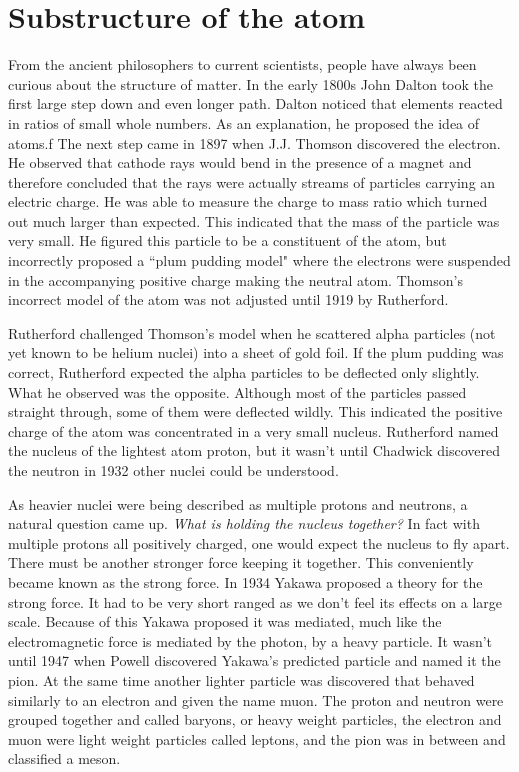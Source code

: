\documentclass[abstract = on,listof=totoc, bibliography=totoc]{scrreprt}
\begin{document}
\section{Substructure of the atom}

From the ancient philosophers to current scientists, people have always been curious about the structure of matter. In the early 1800s John Dalton took the first large step down and even longer path. Dalton noticed that elements reacted in ratios of small whole numbers. As an explanation, he proposed the idea of atoms.f The next step came in 1897 when J.J. Thomson discovered the electron. He observed that cathode rays would bend in the presence of a magnet and therefore concluded that the rays were actually streams of particles carrying an electric charge. He was able to measure the charge to mass ratio which turned out much larger than expected. This indicated that the mass of the particle was very small. He figured this particle to be a constituent of the atom, but incorrectly proposed a ``plum pudding model" where the electrons were suspended in the accompanying positive charge making the neutral atom. Thomson's incorrect model of the atom was not adjusted until 1919 by Rutherford.

Rutherford challenged Thomson's model when he scattered alpha particles (not yet known to be helium nuclei) into a sheet of gold foil. If the plum pudding was correct, Rutherford expected the alpha particles to be deflected only slightly. What he observed was the opposite. Although most of the particles passed straight through, some of them were deflected wildly. This indicated the positive charge of the atom was concentrated in a very small nucleus. Rutherford named the nucleus of the lightest atom proton, but it wasn't until Chadwick discovered the neutron in 1932 other nuclei could be understood.\cite{IEP}

As heavier nuclei were being described as multiple protons and neutrons, a natural question came up. \textit{What is holding the nucleus together?} In fact with multiple protons all positively charged, one would expect the nucleus to fly apart. There must be another stronger force keeping it together. This conveniently became known as the strong force. In 1934 Yakawa proposed a theory for the strong force. It had to be very short ranged as we don't feel its effects on a large scale. Because of this Yakawa proposed it was mediated, much like the electromagnetic force is mediated by the photon, by a heavy particle.  It wasn't until 1947 when Powell discovered Yakawa's predicted particle and named it the pion. At the same time another lighter particle was discovered that behaved similarly to an electron and given the name muon. The proton and neutron were grouped together and called baryons, or heavy weight particles, the electron and muon were light weight particles called leptons, and the pion was in between and classified a meson.\cite{IEP}  
\end{document}
